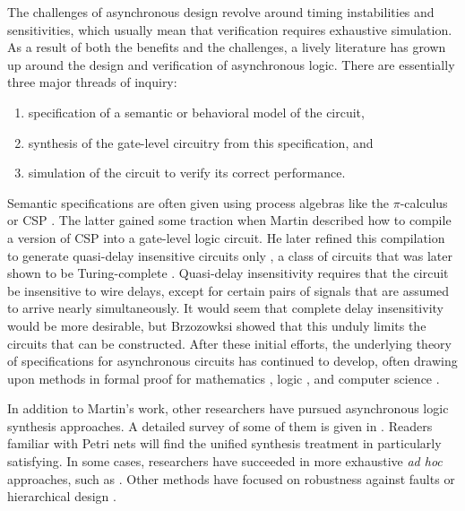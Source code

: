 \documentclass{amsart}
\theoremstyle{plain}
\theoremstyle{definition}
\begin{document}
The challenges of asynchronous design revolve around timing
instabilities and sensitivities, which usually mean that verification
requires exhaustive simulation.  As a result of both the benefits and
the challenges, a lively literature has grown up around the design and
verification of asynchronous logic.  There are essentially three major
threads of inquiry:
\begin{enumerate}
\item specification of a semantic or behavioral model of the circuit,
\item synthesis of the gate-level circuitry from this specification, and 
\item simulation of the circuit to verify its correct performance.
\end{enumerate}

Semantic specifications are often given using process algebras like
the $\pi$-calculus \cite{Parrow} or CSP \cite{Hoare_2004}.  The latter
gained some traction when Martin \cite{Martin_1986} described how to
compile a version of CSP into a gate-level logic circuit.  He later
refined this compilation to generate quasi-delay insensitive circuits
only \cite{Martin_1990}, a class of circuits that was later shown to
be Turing-complete \cite{Manohar_1995}.  Quasi-delay insensitivity
requires that the circuit be insensitive to wire delays, except for
certain pairs of signals that are assumed to arrive nearly
simultaneously.  It would seem that complete delay insensitivity would
be more desirable, but Brzozowksi \cite{Brzozowksi_1992} showed that
this unduly limits the circuits that can be constructed.  After these
initial efforts, the underlying theory of specifications for
asynchronous circuits has continued to develop, often drawing upon
methods in formal proof for mathematics \cite{Harrison_2008}, logic
\cite{Vasyukevich_2009}, and computer science \cite{Dalrymple_2008}.

In addition to Martin's work, other researchers have pursued
asynchronous logic synthesis approaches.  A detailed survey of some of
them is given in \cite{Davis_1997}.  Readers familiar with Petri nets
will find the unified synthesis treatment in \cite{Cortadella}
particularly satisfying.  In some cases, researchers have succeeded in
more exhaustive {\it ad hoc} approaches, such as \cite{Cox_2000}.
Other methods have focused on robustness against faults
\cite{Monnet_2006} or hierarchical design \cite{Butucaru_2007}.
\end{document}
